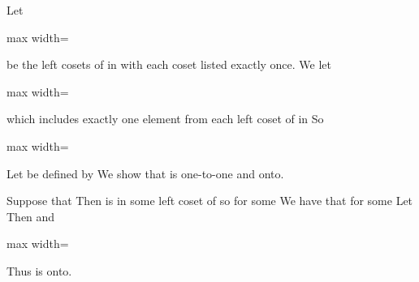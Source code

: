 \documentclass[11pt,oneside]{article}
\begin{document}
\begin{BookBody}
 Let

\begin{center}\begin{adjustbox}{max width=\linewidth}\end{adjustbox}\end{center}

\noindent be the left cosets of  in  with each coset listed exactly once. We let

\begin{center}\begin{adjustbox}{max width=\linewidth}\end{adjustbox}\end{center}

\noindent which includes exactly one element from each left coset of  in  So

\begin{center}\begin{adjustbox}{max width=\linewidth}\end{adjustbox}\end{center}

\noindent Let  be defined by  We show that  is one-to-one and onto.

Suppose that  Then  is in some left coset of  so  for some  We have that  for some  Let  Then   and

\begin{center}\begin{adjustbox}{max width=\linewidth}\end{adjustbox}\end{center}

\noindent Thus  is onto.


\end{BookBody}
\end{document}
